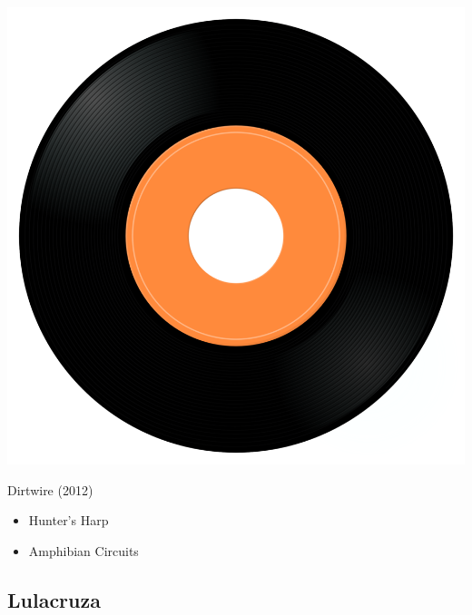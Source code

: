 \begin{minipage}[t]{0.25\textwidth}
\captionsetup{type=figure}
\includegraphics[width=\textwidth]{Images/cover.png}
\caption*{Dirtwire (2012)}
\end{minipage}
\begin{minipage}[t]{0.25\textwidth}\vspace{0pt}
\begin{itemize}[nosep,leftmargin=1em,labelwidth=*,align=left]
	\setlength{\itemsep}{0pt}
	\item Hunter's Harp
	\item Amphibian Circuits
\end{itemize}
\end{minipage}

\subsection{Lulacruza}

